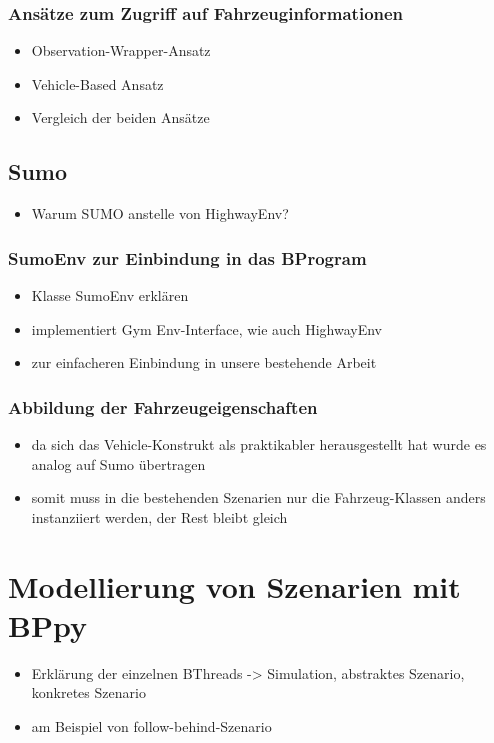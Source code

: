 \subsubsection{Ansätze zum Zugriff auf Fahrzeuginformationen}
\begin{itemize}
    \item Observation-Wrapper-Ansatz
    \item Vehicle-Based Ansatz
    \item Vergleich der beiden Ansätze
\end{itemize}
\subsection{Sumo}
\begin{itemize}
    \item Warum SUMO anstelle von HighwayEnv?
\end{itemize}
\subsubsection{SumoEnv zur Einbindung in das BProgram}
\begin{itemize}
    \item Klasse SumoEnv erklären
    \item implementiert Gym Env-Interface, wie auch HighwayEnv
    \item zur einfacheren Einbindung in unsere bestehende Arbeit
\end{itemize}
\subsubsection{Abbildung der Fahrzeugeigenschaften}
\begin{itemize}
    \item da sich das Vehicle-Konstrukt als praktikabler herausgestellt hat wurde es analog auf Sumo übertragen
    \item somit muss in die bestehenden Szenarien nur die Fahrzeug-Klassen anders instanziiert werden, der Rest bleibt gleich
\end{itemize}
\section{Modellierung von Szenarien mit BPpy}
\begin{itemize}
    \item Erklärung der einzelnen BThreads -> Simulation, abstraktes Szenario, konkretes Szenario
    \item am Beispiel von follow-behind-Szenario
\end{itemize}

